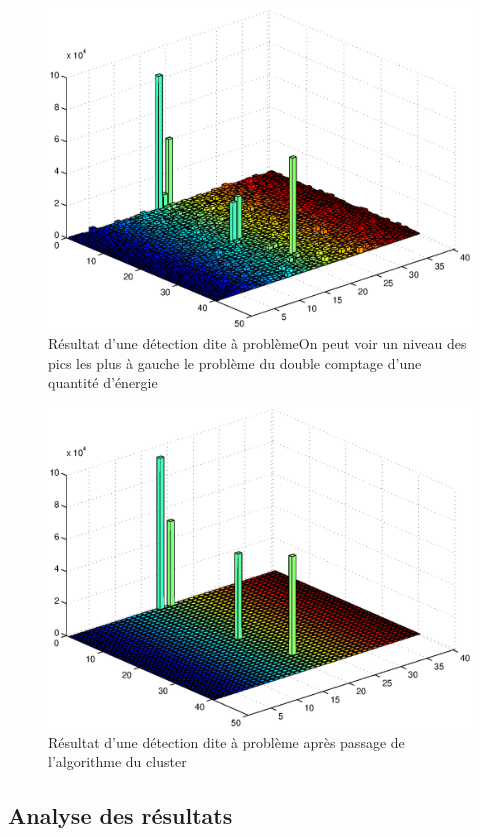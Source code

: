 \documentclass[11pt]{article}
\begin{document}
\begin{figure}
\caption{Résultat d'une détection dite à problème\newline On peut voir un niveau
des pics les plus à gauche le problème du double comptage d'une quantité
d'énergie}
\includegraphics{images/mauvaisCasBrut.eps}
\end{figure}
\begin{figure}
\caption{Résultat  d'une détection dite à problème après passage de l'algorithme
du cluster}
\includegraphics{images/mauvaisCasNet.eps}
\end{figure}

\subsection{Analyse des résultats}
\end{document}
